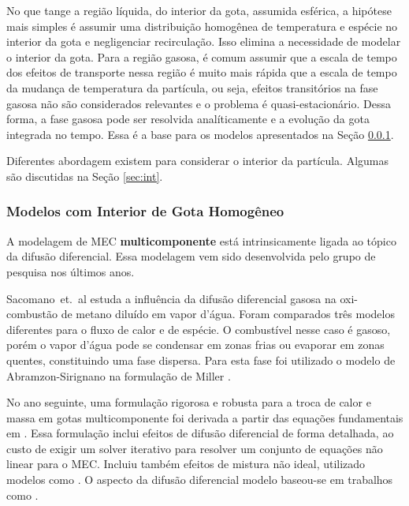 No que tange a região líquida, do interior da gota, assumida esférica, a hipótese mais simples é assumir uma distribuição homogênea de temperatura e espécie no interior da gota e negligenciar recirculação.
Isso elimina a necessidade de modelar o interior da gota.
Para a região gasosa, é comum assumir que a escala de tempo dos efeitos de transporte nessa região é muito mais rápida que a escala de tempo da mudança de temperatura da partícula, ou seja, efeitos transitórios na fase gasosa não são considerados relevantes e o problema é quasi-estacionário.  
Dessa forma, a fase gasosa pode ser resolvida analíticamente e a evolução da gota integrada no tempo.
Essa é a base para os modelos apresentados na Seção \ref{sec:RMM}.

Diferentes abordagem existem para considerar o interior da partícula.
Algumas são discutidas na Seção \ref{sec:int}.


\subsubsection{Modelos com Interior de Gota Homogêneo} \label{sec:RMM}


% 

A modelagem de MEC \textbf{multicomponente} está intrinsicamente ligada ao tópico da difusão diferencial.
Essa modelagem vem sido desenvolvida pelo grupo de pesquisa nos últimos anos.

Sacomano~et.~al \cite{SacomanoF2021Fluids} estuda a influência da difusão diferencial gasosa na oxi-combustão de metano diluído em vapor d'água. 
Foram comparados três modelos diferentes para o fluxo de calor e de espécie.
O combustível nesse caso é gasoso, porém o vapor d'água pode se condensar em zonas frias ou evaporar em zonas quentes, constituindo uma fase dispersa.
Para esta fase foi utilizado o modelo de Abramzon-Sirignano \cite{Sirignano1989} na formulação de Miller \cite{MillerR1998}.

No ano seguinte, uma formulação rigorosa e robusta para a troca de calor e massa em gotas multicomponente foi derivada a partir das equações fundamentais em \cite{SacomanoF2022IJHMT}.
Essa formulação inclui efeitos de difusão diferencial de forma detalhada, ao custo de exigir um solver iterativo para resolver um conjunto de equações não linear para o MEC.
Incluiu também efeitos de mistura não ideal, utilizado modelos como .
O aspecto da difusão diferencial modelo baseou-se em trabalhos como \cite{ToniniS2015IJTS, ZhangL2012Fuel}. 

